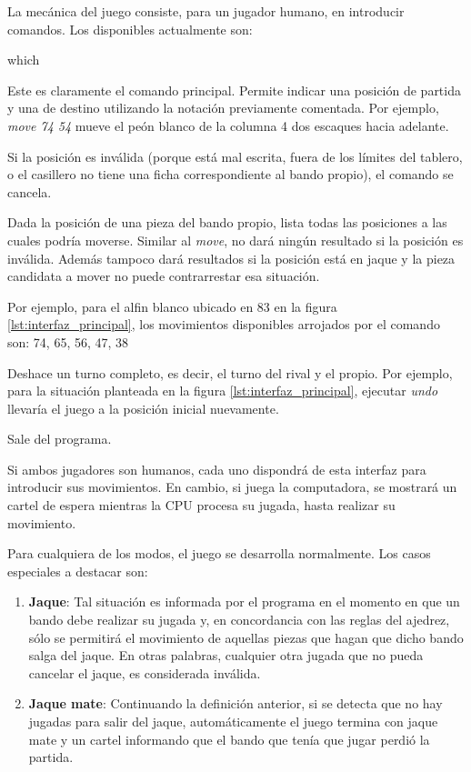 \documentclass{llncs}
\begin{document}
La mecánica del juego consiste, para un jugador humano, en introducir comandos. Los disponibles actualmente son:
\newline

\begin{labeling}{which}
  \item [move] Este es claramente el comando principal. Permite indicar una posición de partida y una de destino utilizando la notación previamente comentada. Por ejemplo, \textit{move 74 54} mueve el peón blanco de la columna 4 dos escaques hacia adelante.

    Si la posición es inválida (porque está mal escrita, fuera de los límites del tablero, o el casillero no tiene una ficha correspondiente al bando propio), el comando se cancela.
  \item[which] Dada la posición de una pieza del bando propio, lista todas las posiciones a las cuales podría moverse. Similar al \textit{move}, no dará ningún resultado si la posición es inválida. Además tampoco dará resultados si la posición está en jaque y la pieza candidata a mover no puede contrarrestar esa situación.

    Por ejemplo, para el alfin blanco ubicado en 83 en la figura \ref{lst:interfaz_principal}, los movimientos disponibles arrojados por el comando son: 74, 65, 56, 47, 38
  \item[undo] Deshace un turno completo, es decir, el turno del rival y el propio. Por ejemplo, para la situación planteada en la figura \ref{lst:interfaz_principal}, ejecutar \textit{undo} llevaría el juego a la posición inicial nuevamente.
  \item[exit] Sale del programa.
\end{labeling}

Si ambos jugadores son humanos, cada uno dispondrá de esta interfaz para introducir sus movimientos. En cambio, si juega la computadora, se mostrará un cartel de espera mientras la CPU procesa su jugada, hasta realizar su movimiento.

Para cualquiera de los modos, el juego se desarrolla normalmente. Los casos especiales a destacar son:

\begin{enumerate}
  \item \textbf{Jaque}: Tal situación es informada por el programa en el momento en que un bando debe realizar su jugada y, en concordancia con las reglas del ajedrez, sólo se permitirá el movimiento de aquellas piezas que hagan que dicho bando salga del jaque. En otras palabras, cualquier otra jugada que no pueda cancelar el jaque, es considerada inválida.
  \item \textbf{Jaque mate}: Continuando la definición anterior, si se detecta que no hay jugadas para salir del jaque, automáticamente el juego termina con jaque mate y un cartel informando que el bando que tenía que jugar perdió la partida.
\end{enumerate}
\end{document}
